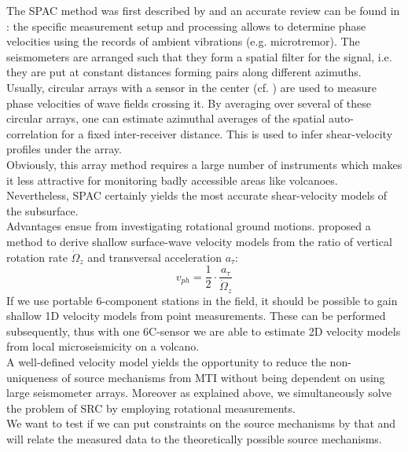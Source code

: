 \documentclass[12pt, a4paper]{article}
\begin{document}
The SPAC method was first described by \citet{Aki1957} and an accurate review can be found in \citet{Chavez2005}: the specific measurement setup and processing allows to determine phase velocities using the records of ambient vibrations (e.g. microtremor). The seismometers are arranged such that they form a spatial filter for the signal, i.e. they are put at constant distances forming pairs along different azimuths. Usually, circular arrays with a sensor in the center (cf. \citet{Aki1965}) are used to measure phase velocities of wave fields crossing it. By averaging over several of these circular arrays, one can estimate azimuthal averages of the spatial auto-correlation for a fixed inter-receiver distance. This is used to infer shear-velocity profiles under the array.\\
Obviously, this array method requires a large number of instruments which makes it less attractive for monitoring badly accessible areas like volcanoes. Nevertheless, SPAC certainly yields the most accurate shear-velocity models of the subsurface.\\


Advantages ensue from investigating rotational ground motions. \citet{Igel2005} proposed a method to derive shallow surface-wave velocity models from the ratio of vertical rotation rate $\dot{\Omega}_z$ and transversal acceleration $a_\tau$:
\begin{equation}
	v_{ph} = \frac{1}{2} \cdot \frac{a_\tau}{\dot{\Omega}_z}
\end{equation}
If we use portable 6-component stations in the field, it should be possible to gain shallow 1D velocity models from point measurements. These can be performed subsequently, thus with one 6C-sensor we are able to estimate 2D velocity models from local microseismicity on a volcano.\\

A well-defined velocity model yields the opportunity to reduce the non-uniqueness of source mechanisms from MTI without being dependent on using large seismometer arrays. Moreover as explained above, we simultaneously solve the problem of SRC by employing rotational measurements.\\
We want to test if we can put constraints on the source mechanisms by that and will relate the measured data to the theoretically possible source mechanisms.
\end{document}

